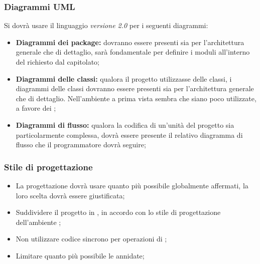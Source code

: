     \subsubsection{Diagrammi UML}
    Si dovrà usare il linguaggio  \emph{versione 2.0} per i seguenti diagrammi:
\begin{itemize}
 \item \textbf{Diagrammi dei package:} dovranno essere presenti sia per l'architettura generale che di dettaglio, sarà fondamentale per definire i moduli all'interno del   richiesto dal capitolato;
 \item \textbf{Diagrammi delle classi:} qualora il progetto utilizzasse delle classi, i diagrammi delle classi dovranno essere presenti sia per l'architettura generale che di dettaglio. Nell'ambiente  a prima vista sembra che siano poco utilizzate, a favore dei ;
 \item \textbf{Diagrammi di flusso:} qualora la codifica di un'unità del progetto sia particolarmente complessa, dovrà essere presente il relativo diagramma di flusso che il programmatore dovrà seguire;
\end{itemize}

    \subsubsection{Stile di progettazione}
    \begin{itemize}
        \item La progettazione dovrà usare quanto più possibile  globalmente affermati, la loro scelta dovrà essere giustificata;
        \item Suddividere il progetto in , in accordo con lo stile di progettazione dell'ambiente ;
        \item Non utilizzare codice sincrono per operazioni di ;
        \item Limitare quanto più possibile le  annidate;
    \end{itemize}




